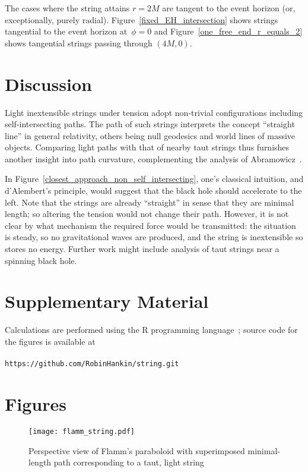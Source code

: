 \documentclass[review]{elsarticle}
\begin{document}
The cases where the string attains $r=2M$ are tangent to the event
horizon (or, exceptionally, purely radial).
Figure~\ref{fixed_EH_intersection} shows strings tangential to the
event horizon at~$\phi=0$ and Figure~\ref{one_free_end_r_equals_2}
shows tangential strings passing through $(4M,0)$.

\section{Discussion}

Light inextensible strings under tension adopt non-trivial
configurations including self-intersecting paths.  The path of such
strings interprets the concept ``straight line'' in general
relativity, others being null geodesics and world lines of massive
objects.  Comparing light paths with that of nearby taut strings thus
furnishes another insight into path curvature, complementing the
analysis of Abramowicz~\cite{abramowicz1992}.

In Figure~\ref{closest_approach_non_self_intersecting}, one's
classical intuition, and d'Alembert's principle, would suggest that
the black hole should accelerate to the left.  Note that the strings
are already ``straight'' in sense that they are minimal length; so
altering the tension would not change their path.  However, it is not
clear by what mechanism the required force would be transmitted: the
situation is steady, so no gravitational waves are produced, and the
string is inextensible so stores no energy.  Further work might
include analysis of taut strings near a spinning black hole.


\section*{Supplementary Material}

Calculations are performed using the R programming language~\cite{rcore2018};
source code for the figures is available at
\\
\\
{\tt https://github.com/RobinHankin/string.git}


\section*{Figures}

\begin{figure}[h!] %
\centering
\texttt{[image: flamm\_string.pdf]}
\caption{Perspective view of Flamm's paraboloid with superimposed minimal-length
  path corresponding to a taut, light string}
\label{flamm}
\end{figure}
\end{document}
